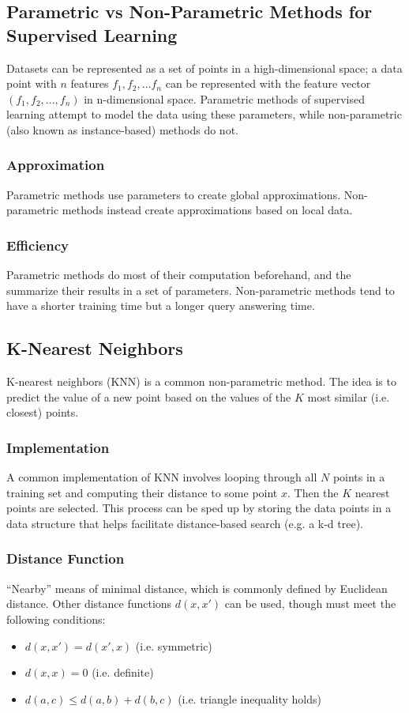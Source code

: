 \documentclass[12pt,titlepage]{article}
\begin{document}
    \subsection{Parametric vs Non-Parametric Methods for Supervised Learning}
      Datasets can be represented as a set of points in a high-dimensional space; a data point with $n$ features $f_1, f_2, ... f_n$ can be represented
      with the feature vector $(f_1, f_2, ..., f_n)$ in n-dimensional space. Parametric methods of supervised learning attempt to model the data using
      these parameters, while non-parametric (also known as instance-based) methods do not.

      \subsubsection{Approximation}
        Parametric methods use parameters to create global approximations. Non-parametric methods instead create approximations based on local data.

      \subsubsection{Efficiency}
        Parametric methods do most of their computation beforehand, and the summarize their results in a set of parameters. Non-parametric methods tend to
        have a shorter training time but a longer query answering time.

    \subsection{K-Nearest Neighbors}
      K-nearest neighbors (KNN) is a common non-parametric method. The idea is to predict the value of a new point based on the values of the $K$ most similar
      (i.e. closest) points.

      \subsubsection{Implementation}
        A common implementation of KNN involves looping through all $N$ points in a training set and computing their distance to some point $x$. Then the $K$ nearest
        points are selected. This process can be sped up by storing the data points in a data structure that helps facilitate distance-based search (e.g. a k-d tree).

      \subsubsection{Distance Function}
        ``Nearby'' means of minimal distance, which is commonly defined by Euclidean distance. Other distance functions $d(x, x')$ can be used, though must meet
        the following conditions:
        \begin{itemize}
          \item $d(x, x') = d(x', x)$ (i.e. symmetric)
          \item $d(x, x) = 0$ (i.e. definite)
          \item $d(a, c) \leq d(a, b) + d(b, c)$ (i.e. triangle inequality holds)
        \end{itemize}
\end{document}
